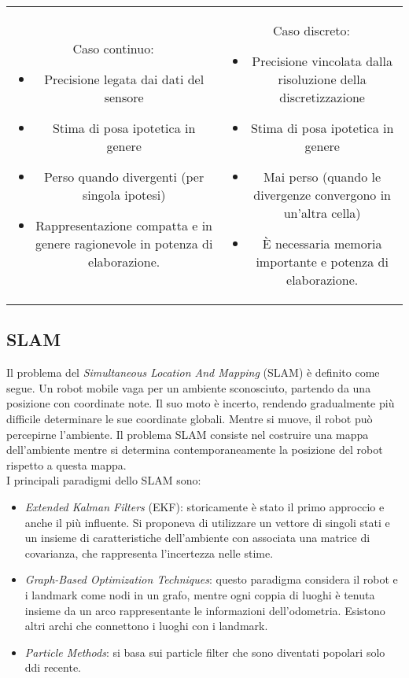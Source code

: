 \documentclass[a4paper,portrait,12pt]{article}
\theoremstyle{definition}
\begin{document}
\begin{table}
\begin{tabular}{cc}
\begin{minipage}{.5\linewidth}
Caso continuo:
\begin{itemize}
\item Precisione legata dai dati del sensore
\item Stima di posa ipotetica in genere
\item Perso quando divergenti (per singola ipotesi)
\item Rappresentazione compatta e in genere ragionevole in potenza di elaborazione.
\end{itemize}
\end{minipage}
&
\begin{minipage}{.5\linewidth}
Caso discreto:
\begin{itemize}
\item Precisione vincolata dalla risoluzione della discretizzazione
\item Stima di posa ipotetica in genere
\item Mai perso (quando le divergenze convergono in un'altra cella)
\item È necessaria memoria importante e potenza di elaborazione.
\end{itemize}
\end{minipage}
\end{tabular}
\end{table}


\subsection{SLAM}

Il problema del \emph{Simultaneous Location And Mapping} (SLAM) è definito come segue.
Un robot mobile vaga per un ambiente sconosciuto, partendo da una posizione con coordinate note.
Il suo moto è incerto, rendendo gradualmente più difficile determinare le sue coordinate globali.
Mentre si muove, il robot può percepirne l'ambiente.
Il problema SLAM consiste nel costruire una mappa dell'ambiente mentre si determina contemporaneamente la posizione del robot rispetto a questa mappa.\\

I principali paradigmi dello SLAM sono:
\begin{itemize}
\item \emph{Extended Kalman Filters} (EKF): storicamente è stato il primo approccio e anche il più influente.
Si proponeva di utilizzare un vettore di singoli stati e un insieme di caratteristiche dell'ambiente con associata una matrice di covarianza, che rappresenta l'incertezza nelle stime.
\item \emph{Graph-Based Optimization Techniques}: questo paradigma considera il robot e i landmark come nodi in un grafo, mentre ogni coppia di luoghi è tenuta insieme da un arco rappresentante le informazioni dell'odometria.
Esistono altri archi che connettono i luoghi con i landmark.
\item \emph{Particle Methods}: si basa sui particle filter che sono diventati popolari solo ddi recente.
\end{itemize}
\end{document}

